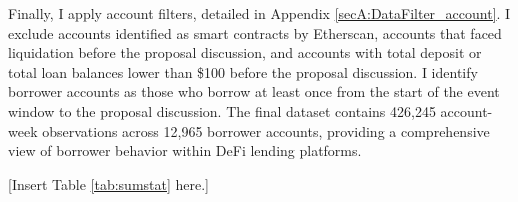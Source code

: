 \documentclass[12pt]{article}
\begin{document}

Finally, I apply account filters, detailed in Appendix \ref{secA:DataFilter_account}. I exclude accounts identified as smart contracts by Etherscan, accounts that faced liquidation before the proposal discussion, and accounts with total deposit or total loan balances lower than \$100 before the proposal discussion. I identify borrower accounts as those who borrow at least once from the start of the event window to the proposal discussion. The final dataset contains 426,245 account-week observations across 12,965 borrower accounts, providing a comprehensive view of borrower behavior within DeFi lending platforms.


\centerline{[Insert Table \ref{tab:sumstat} here.]}
\end{document}
